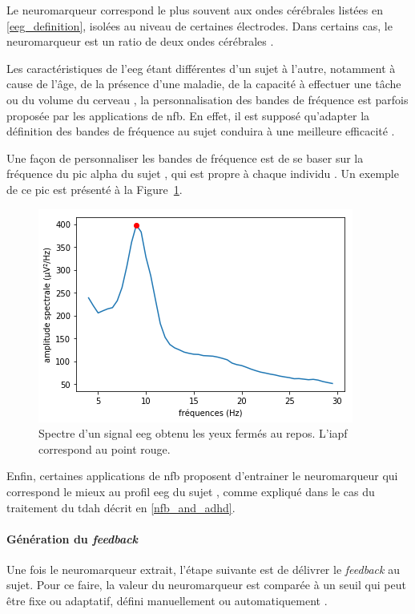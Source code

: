 Le neuromarqueur correspond le plus souvent aux ondes cérébrales listées en \ref{eeg_definition}, isolées au 
niveau de certaines électrodes. Dans certains cas, le neuromarqueur est un ratio de deux ondes cérébrales \citep{Gevensleben2009}. 

Les caractéristiques de l'\gls{eeg} étant différentes d'un sujet à l'autre, notamment à cause de l'âge, de la présence d'une maladie, de la capacité à effectuer une tâche ou du volume 
du cerveau \citep{Enriquez2017, Klimesch1999, Moretti2004, Alkoby2017}, la personnalisation des bandes de fréquence est parfois proposée par les applications de \gls{nfb}. 
En effet, il est supposé qu'adapter la définition des bandes de fréquence au sujet conduira à une meilleure efficacité \citep{Enriquez2017}. 

Une façon de personnaliser les bandes de fréquence est de se baser sur la fréquence du pic alpha du sujet \citep{Alkoby2017, Escolano2014, Bazanova2018, Bioulac2019}, qui 
est propre à chaque individu \citep{Haegens2014, Aurlien2004, Smit2006}. Un exemple de ce pic est présenté à la Figure~\ref{Figure:introduction_iapf}.

\begin{figure}[h!]
  \centering
	\includegraphics[width=0.7\linewidth]{figures/chapter-1/introduction-iapf} 
  \caption{Spectre d'un signal \gls{eeg} obtenu les yeux fermés au repos. L'\gls{iapf} correspond au point rouge.}
  \label{Figure:introduction_iapf}
\end{figure}

Enfin, certaines applications de \gls{nfb} proposent d'entrainer le neuromarqueur qui correspond le mieux au profil \gls{eeg} du sujet 
\citep{Bioulac2019, Kerson2013}, comme expliqué dans le cas du traitement du \gls{tdah} décrit en \ref{nfb_and_adhd}. 

\paragraph{Génération du \textit{feedback}}
Une fois le neuromarqueur extrait, l'étape suivante est de délivrer le \textit{feedback} au sujet. Pour ce faire, la valeur du neuromarqueur est comparée à un seuil
qui peut être fixe ou adaptatif, défini manuellement ou automatiquement \citep{Arns2014}.

